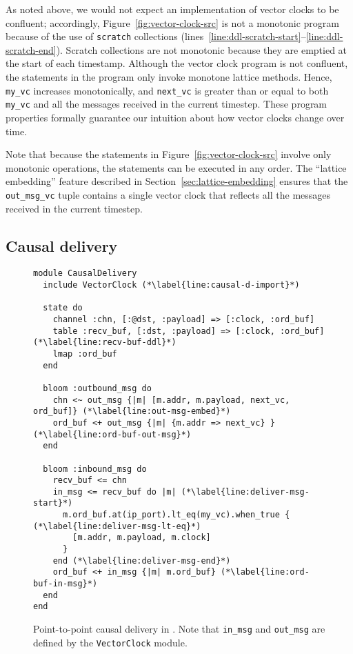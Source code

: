 As noted above, we would not expect an implementation of vector clocks to be
confluent; accordingly, Figure~\ref{fig:vector-clock-src} is not a monotonic
\lang program because of the use of \texttt{scratch} collections
(lines~\ref{line:ddl-scratch-start}--\ref{line:ddl-scratch-end}). Scratch
collections are not monotonic because they are emptied at the start of each
timestamp. Although the vector clock program is not confluent, the statements in
the program only invoke monotone lattice methods. Hence, \texttt{my\_vc}
increases monotonically, and \texttt{next\_vc} is greater than or equal to both
\texttt{my\_vc} and all the messages received in the current timestep. These
program properties formally guarantee our intuition about how vector clocks
change over time.

Note that because the statements in Figure~\ref{fig:vector-clock-src} involve
only monotonic operations, the statements can be executed in any order. The
``lattice embedding'' feature described in Section~\ref{sec:lattice-embedding}
ensures that the \texttt{out\_msg\_vc} tuple contains a single vector clock that
reflects all the messages received in the current timestep.


\subsection{Causal delivery}
\begin{figure}[t]
\begin{scriptsize}
\begin{lstlisting}
module CausalDelivery
  include VectorClock (*\label{line:causal-d-import}*)

  state do
    channel :chn, [:@dst, :payload] => [:clock, :ord_buf]
    table :recv_buf, [:dst, :payload] => [:clock, :ord_buf] (*\label{line:recv-buf-ddl}*)
    lmap :ord_buf
  end

  bloom :outbound_msg do
    chn <~ out_msg {|m| [m.addr, m.payload, next_vc, ord_buf]} (*\label{line:out-msg-embed}*)
    ord_buf <+ out_msg {|m| {m.addr => next_vc} } (*\label{line:ord-buf-out-msg}*)
  end

  bloom :inbound_msg do
    recv_buf <= chn
    in_msg <= recv_buf do |m| (*\label{line:deliver-msg-start}*)
      m.ord_buf.at(ip_port).lt_eq(my_vc).when_true { (*\label{line:deliver-msg-lt-eq}*)
        [m.addr, m.payload, m.clock]
      }
    end (*\label{line:deliver-msg-end}*)
    ord_buf <+ in_msg {|m| m.ord_buf} (*\label{line:ord-buf-in-msg}*)
  end
end
\end{lstlisting}
\end{scriptsize}
\caption{Point-to-point causal delivery in \lang. Note that \texttt{in\_msg} and
\texttt{out\_msg} are defined by the \texttt{VectorClock} module.}
\label{fig:causal-delivery-src}
\end{figure}

